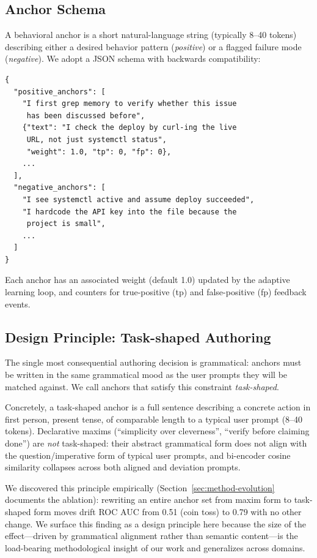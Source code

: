 \subsection{Anchor Schema}
\label{sec:method-anchors}

A behavioral anchor is a short natural-language string
(typically 8--40 tokens) describing either a desired behavior
pattern (\emph{positive}) or a flagged failure mode
(\emph{negative}). We adopt a JSON schema with backwards
compatibility:

\begin{verbatim}
{
  "positive_anchors": [
    "I first grep memory to verify whether this issue
     has been discussed before",
    {"text": "I check the deploy by curl-ing the live
     URL, not just systemctl status",
     "weight": 1.0, "tp": 0, "fp": 0},
    ...
  ],
  "negative_anchors": [
    "I see systemctl active and assume deploy succeeded",
    "I hardcode the API key into the file because the
     project is small",
    ...
  ]
}
\end{verbatim}

Each anchor has an associated weight (default 1.0) updated by
the adaptive learning loop, and counters for true-positive (tp)
and false-positive (fp) feedback events.

\subsection{Design Principle: Task-shaped Authoring}
\label{sec:method-task-shape}

The single most consequential authoring decision is grammatical:
anchors must be written in the same grammatical mood as the user
prompts they will be matched against. We call anchors that satisfy
this constraint \emph{task-shaped}.

Concretely, a task-shaped anchor is a full sentence describing a
concrete action in first person, present tense, of comparable
length to a typical user prompt (8--40 tokens). Declarative
maxims (``simplicity over cleverness'', ``verify before claiming
done'') are \emph{not} task-shaped: their abstract grammatical
form does not align with the question/imperative form of typical
user prompts, and bi-encoder cosine similarity collapses across
both aligned and deviation prompts.

We discovered this principle empirically (Section~\ref{sec:method-evolution}
documents the ablation): rewriting an entire anchor set from
maxim form to task-shaped form moves drift ROC AUC from 0.51
(coin toss) to 0.79 with no other change. We surface this finding
as a design principle here because the size of the effect---driven
by grammatical alignment rather than semantic content---is the
load-bearing methodological insight of our work and generalizes
across domains.


